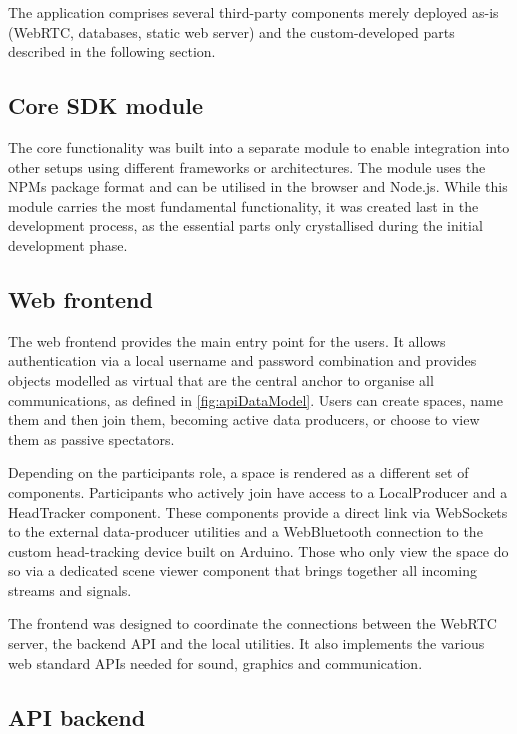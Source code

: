 The application comprises several third-party components merely deployed as-is (WebRTC, databases, static web server) and the custom-developed parts described in the following section.

\subsection{Core SDK module}
\label{subsec:core-sdk-module}

The core functionality was built into a separate module to enable integration into other setups using different frameworks or architectures.
The module uses the \ac{NPM}\textquotesingle s package format and can be utilised in the browser and Node.js.
While this module carries the most fundamental functionality, it was created last in the development process, as the essential parts only crystallised during the initial development phase.

\subsection{Web frontend}
\label{subsec:web-frontend}

The web frontend provides the main entry point for the users.
It allows authentication via a local username and password combination and provides objects modelled as virtual  that are the central anchor to organise all communications, as defined in \autoref{fig:apiDataModel}.
Users can create spaces, name them and then join them, becoming active data producers, or choose to view them as passive spectators.

Depending on the participant\textquotesingle s role, a space is rendered as a different set of components.
Participants who actively join have access to a LocalProducer and a HeadTracker component.
These components provide a direct link via WebSockets to the external data-producer utilities and a WebBluetooth connection to the custom head-tracking device built on Arduino.
Those who only view the space do so via a dedicated scene viewer component that brings together all incoming streams and signals.

The frontend was designed to coordinate the connections between the WebRTC server, the backend \ac{API} and the local utilities.
It also implements the various web standard \ac{API}s needed for sound, graphics and communication.

\subsection{API backend}
\label{subsec:api-backend}

